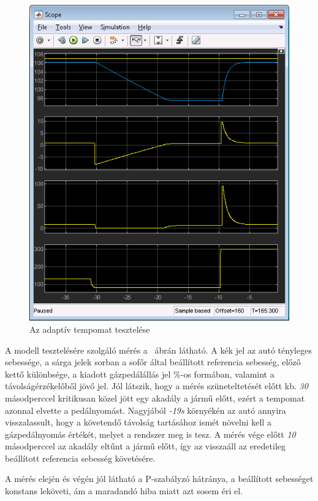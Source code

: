 \begin{figure}[!ht]
	\centering
	\includegraphics[width=120mm,keepaspectratio]{figures/2m04/f2_scope_3.png}
	\caption{Az adaptív tempomat tesztelése}
	\label{fig:scope2}
\end{figure}



A modell tesztelésére szolgáló mérés a ~ábrán látható. A kék jel az autó tényleges sebessége, a sárga jelek sorban a sofőr által beállított referencia sebesség, előző kettő különbsége, a kiadott gázpedálállás jel \%-os formában, valamint a távolságérzékelőből jövő jel. Jól látszik, hogy a mérés szüneteltetését előtt kb. \textit{30} másodperccel kritikusan közel jött egy akadály a jármű előtt, ezért a tempomat azonnal elvette a pedálnyomást. Nagyjából \textit{-19s} környékén az autó annyira visszalassult, hogy a követendő távolság tartásához ismét növelni kell a gázpedálnyomás értékét, melyet a rendszer meg is tesz. A mérés vége előtt \textit{10} másodperccel az akadály eltűnt a jármű előtt, így az visszaáll az eredetileg beállított referencia sebesség követésére.

A mérés elején és végén jól látható a P-szabályzó hátránya, a beállított sebességet konstans leköveti, ám a maradandó hiba miatt azt sosem éri el.

